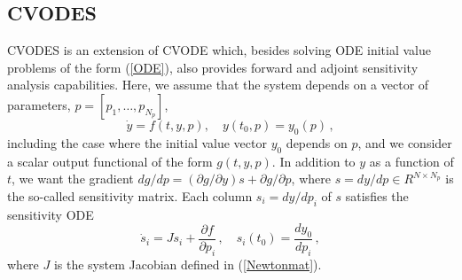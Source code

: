 \subsection{CVODES}\label{ss:cvodes}

CVODES is an extension of CVODE which, besides solving ODE initial
value problems of the form (\ref{ODE}), also provides forward and 
adjoint sensitivity analysis capabilities.
%
Here, we assume that the system depends on a vector of parameters,
$p = [p_1,\ldots,p_{N_p}]$,
\begin{equation}\label{e:ODE_with_p}
\dot{y} = f(t,y,p), \quad y(t_0,p) = y_0(p) \, ,
\end{equation}
including the case where the initial value vector $y_0$ depends on $p$,
and we consider a scalar output functional of the form $g(t,y,p)$.
%
In addition to $y$ as a function of $t$, we want the gradient 
$d g / d p  = ({\partial g}/{\partial y}) s + {\partial g}/{\partial p}$, 
where $s = dy/dp \in R^{N \times N_p}$ is the so-called sensitivity matrix.
%
Each column $s_i = d y / d p_i$ of $s$ satisfies the sensitivity ODE
\begin{equation}\label{e:fwdODE}
\dot{s}_i = J s_i + \frac{\partial f}{\partial p_i} \, , 
\quad s_i(t_0) = \frac{d y_0}{d p_i} \, ,
\end{equation}
where $J$ is the system Jacobian defined in (\ref{Newtonmat}).

